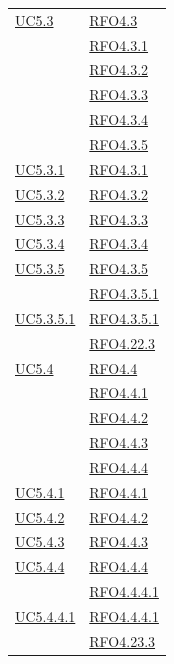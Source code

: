 \begin{itemize}
\begin{itemize}
\begin{itemize}
\begin{itemize}
\begin{longtable}{|>{\centering}m{5cm}|m{5cm}<{\centering}|}
\hyperref[UC5.3]{UC5.3} & \hyperlink{RFO4.3}{RFO4.3}\\
& \hyperlink{RFO4.3.1}{RFO4.3.1}\\
& \hyperlink{RFO4.3.2}{RFO4.3.2}\\
& \hyperlink{RFO4.3.3}{RFO4.3.3}\\
& \hyperlink{RFO4.3.4}{RFO4.3.4}\\
& \hyperlink{RFO4.3.5}{RFO4.3.5}\\ \hline
\hyperref[UC5.3.1]{UC5.3.1} & \hyperlink{RFO4.3.1}{RFO4.3.1}\\ \hline
\hyperref[UC5.3.2]{UC5.3.2} & \hyperlink{RFO4.3.2}{RFO4.3.2}\\ \hline
\hyperref[UC5.3.3]{UC5.3.3} & \hyperlink{RFO4.3.3}{RFO4.3.3}\\ \hline
\hyperref[UC5.3.4]{UC5.3.4} & \hyperlink{RFO4.3.4}{RFO4.3.4}\\ \hline
\hyperref[UC5.3.5]{UC5.3.5} & \hyperlink{RFO4.3.5}{RFO4.3.5}\\
& \hyperlink{RFO4.3.5.1}{RFO4.3.5.1}\\ \hline
\hyperref[UC5.3.5.1]{UC5.3.5.1} & \hyperlink{RFO4.3.5.1}{RFO4.3.5.1}\\ & \hyperlink{RFO4.22.3}{RFO4.22.3}\\ \hline

\hyperref[UC5.4]{UC5.4} & \hyperlink{RFO4.4}{RFO4.4}\\
& \hyperlink{RFO4.4.1}{RFO4.4.1}\\
& \hyperlink{RFO4.4.2}{RFO4.4.2}\\
& \hyperlink{RFO4.4.3}{RFO4.4.3}\\
& \hyperlink{RFO4.4.4}{RFO4.4.4}\\ \hline
\hyperref[UC5.4.1]{UC5.4.1} & \hyperlink{RFO4.4.1}{RFO4.4.1}\\ \hline
\hyperref[UC5.4.2]{UC5.4.2} & \hyperlink{RFO4.4.2}{RFO4.4.2}\\ \hline
\hyperref[UC5.4.3]{UC5.4.3} & \hyperlink{RFO4.4.3}{RFO4.4.3}\\ \hline
\hyperref[UC5.4.4]{UC5.4.4} & \hyperlink{RFO4.4.4}{RFO4.4.4}\\
& \hyperlink{RFO4.4.4.1}{RFO4.4.4.1}\\ \hline
\hyperref[UC5.4.4.1]{UC5.4.4.1} & \hyperlink{RFO4.4.4.1}{RFO4.4.4.1}\\ & \hyperlink{RFO4.23.3}{RFO4.23.3}\\ \hline


\end{longtable}
\end{itemize}
\end{itemize}
\end{itemize}
\end{itemize}
